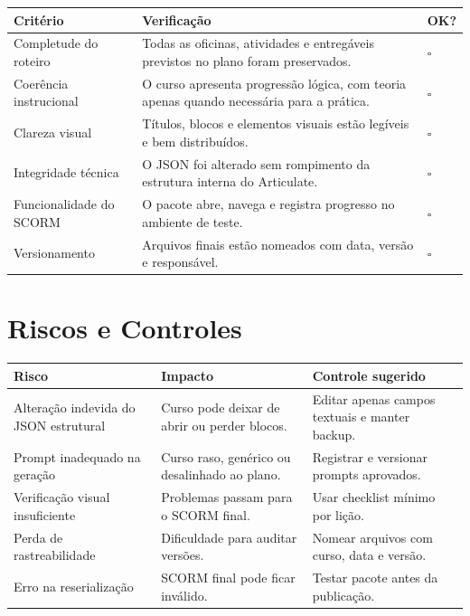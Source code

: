 \documentclass[12pt,a4paper]{article}
\begin{document}
\begin{longtable}{p{}p{}p{}}
\toprule
\textbf{Critério} & \textbf{Verificação} & \textbf{OK?} \\
\midrule
Completude do roteiro & Todas as oficinas, atividades e entregáveis previstos no plano foram preservados. & $\square$ \\
Coerência instrucional & O curso apresenta progressão lógica, com teoria apenas quando necessária para a prática. & $\square$ \\
Clareza visual & Títulos, blocos e elementos visuais estão legíveis e bem distribuídos. & $\square$ \\
Integridade técnica & O JSON foi alterado sem rompimento da estrutura interna do Articulate. & $\square$ \\
Funcionalidade do SCORM & O pacote abre, navega e registra progresso no ambiente de teste. & $\square$ \\
Versionamento & Arquivos finais estão nomeados com data, versão e responsável. & $\square$ \\
\bottomrule
\end{longtable}

\section{Riscos e Controles}

\begin{longtable}{p{}p{}p{}}
\toprule
\textbf{Risco} & \textbf{Impacto} & \textbf{Controle sugerido} \\
\midrule
Alteração indevida do JSON estrutural & Curso pode deixar de abrir ou perder blocos. & Editar apenas campos textuais e manter backup. \\
Prompt inadequado na geração & Curso raso, genérico ou desalinhado ao plano. & Registrar e versionar prompts aprovados. \\
Verificação visual insuficiente & Problemas passam para o SCORM final. & Usar checklist mínimo por lição. \\
Perda de rastreabilidade & Dificuldade para auditar versões. & Nomear arquivos com curso, data e versão. \\
Erro na reserialização & SCORM final pode ficar inválido. & Testar pacote antes da publicação. \\
\bottomrule
\end{longtable}
\end{document}
